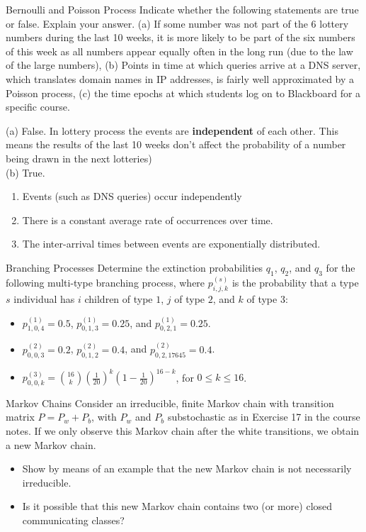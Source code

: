\begin{problem}{Bernoulli and Poisson Process}
 Indicate whether the following statements are true or false. Explain your answer.
(a) If some number was not part of the 6 lottery numbers during the last 10 weeks, it is more likely to be part of the six numbers of this week as all numbers appear equally often in the long run (due to the law of the large numbers), (b) Points in time at which queries arrive at a DNS server, which translates domain names in IP addresses, is fairly well approximated by a Poisson process, (c) the time epochs at which students log on to Blackboard
for a specific course.
\end{problem}

\begin{solution}
(a) False. In lottery process the events are \textbf{independent} of each other. This means the results of the last 10 weeks don't affect the probability of a number being drawn in the next lotteries)\\
(b) True.
\begin{enumerate}
    \item Events (such as DNS queries) occur independently
    \item There is a constant average rate of occurrences over time.
\item The inter-arrival times between events are exponentially distributed.
\end{enumerate}
\end{solution}

\begin{problem}{Branching Processes}
Determine the extinction probabilities $q_1$, $q_2$, and $q_3$ for the
following multi-type branching process, where $p^{(s)}_{i,j,k}$ is the probability that a type $s$ individual
has $i$ children of type $1$, $j$ of type $2$, and $k$ of type $3$:
\begin{itemize}
    \item $p^{(1)}_{1,0,4} = 0.5$, $p^{(1)}_{0,1,3} = 0.25$, and $p^{(1)}_{0,2,1} = 0.25$.
    \item $p^{(2)}_{0,0,3} = 0.2$, $p^{(2)}_{0,1,2} = 0.4$, and $p^{(2)}_{0,2,17645} = 0.4$.
    \item $p^{(3)}_{0,0,k} = \binom{16}{k} \left( \frac{1}{20} \right)^k \left(1 - \frac{1}{20}\right)^{16 - k}$, for $0 \leq k \leq 16$.
\end{itemize}
\end{problem}

\begin{problem}{Markov Chains}
Consider an irreducible, finite Markov chain with transition matrix
$P = P_w + P_b$, with $P_w$ and $P_b$ substochastic as in Exercise 17 in the course notes. If
we only observe this Markov chain after the white transitions, we obtain a new Markov
chain. 
\begin{itemize}
    \item[(a)] Show by means of an example that the new Markov chain is not necessarily irreducible. 
    \item[(b)] Is it possible that this new Markov chain contains two (or more) closed communicating classes?
\end{itemize}
\end{problem}

